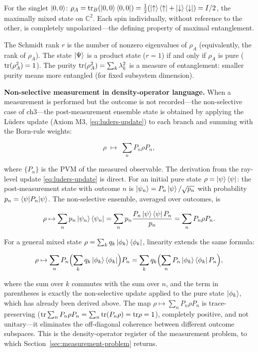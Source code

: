 For the singlet $\ket{0,0}$: $\rho_A = \mathrm{tr}_B(\ket{0,0}\bra{0,0}) = \frac12(\ket{\uparrow}\bra{\uparrow} + \ket{\downarrow}\bra{\downarrow}) = I/2$, the maximally mixed state on $\mathbb{C}^2$. Each spin individually, without reference to the other, is completely unpolarized---the defining property of maximal entanglement.

\begin{note}
The Schmidt rank $r$ is the number of nonzero eigenvalues of $\rho_A$ (equivalently, the rank of $\rho_A$). The state $\ket{\Psi}$ is a product state ($r=1$) if and only if $\rho_A$ is pure ($\mathrm{tr}(\rho_A^2) = 1$). The purity $\mathrm{tr}(\rho_A^2) = \sum_k \lambda_k^2$ is a measure of entanglement: smaller purity means more entangled (for fixed subsystem dimension).
\end{note}

\medskip\noindent\textbf{Non-selective measurement in density-operator language.}
When a measurement is performed but the outcome is not recorded---the non-selective case of ch3---the post-measurement ensemble state is obtained by applying the L\"uders update (Axiom M3, \eqref{eq:luders-update}) to each branch and summing with the Born-rule weights:
\begin{linenomath}
\begin{equation}
\rho \;\mapsto\; \sum_n P_n \rho P_n,
\label{eq:non-selective-density}
\end{equation}
\end{linenomath}
where $\{P_n\}$ is the PVM of the measured observable. The derivation from the ray-level update \eqref{eq:luders-update} is direct. For an initial pure state $\rho = \ket{\psi}\bra{\psi}$: the post-measurement state with outcome $n$ is $\ket{\psi_n} = P_n\ket{\psi}/\sqrt{p_n}$ with probability $p_n = \braket{\psi|P_n|\psi}$. The non-selective ensemble, averaged over outcomes, is
\begin{linenomath}
\begin{equation}
\rho \mapsto \sum_n p_n \ket{\psi_n}\bra{\psi_n}
= \sum_n p_n \frac{P_n\ket{\psi}\bra{\psi}P_n}{p_n}
= \sum_n P_n \rho P_n.
\end{equation}
\end{linenomath}
For a general mixed state $\rho = \sum_k q_k \ket{\phi_k}\bra{\phi_k}$, linearity extends the same formula:
\begin{linenomath}
\begin{align}
\rho \mapsto \sum_n P_n\Bigl(\sum_k q_k \ket{\phi_k}\bra{\phi_k}\Bigr)P_n
= \sum_k q_k \Bigl(\sum_n P_n \ket{\phi_k}\bra{\phi_k} P_n\Bigr),
\end{align}
\end{linenomath}
where the sum over $k$ commutes with the sum over $n$, and the term in parentheses is exactly the non-selective update applied to the pure state $\ket{\phi_k}$, which has already been derived above. The map $\rho \mapsto \sum_n P_n \rho P_n$ is trace-preserving ($\mathrm{tr}\sum_n P_n\rho P_n = \sum_n \mathrm{tr}(P_n\rho) = \mathrm{tr}\rho = 1$), completely positive, and not unitary---it eliminates the off-diagonal coherence between different outcome subspaces. This is the density-operator register of the measurement problem, to which Section~\ref{sec:measurement-problem} returns.

